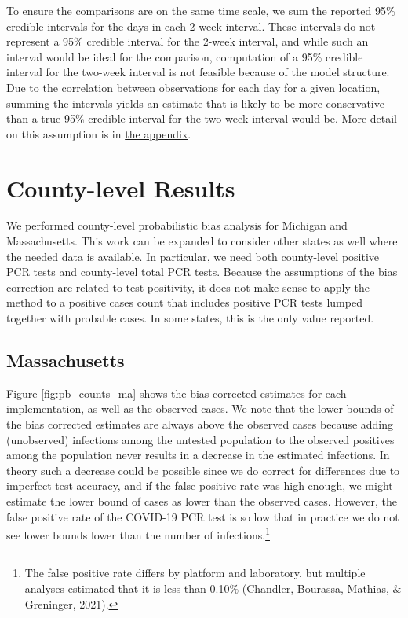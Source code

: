 \documentclass[12pt,twoside]{smiththesis}
\begin{document}
To ensure the comparisons are on the same time scale, we sum the reported 95\% credible intervals for the days in each 2-week interval. These intervals do not represent a 95\% credible interval for the 2-week interval, and while such an interval would be ideal for the comparison, computation of a 95\% credible interval for the two-week interval is not feasible because of the model structure. Due to the correlation between observations for each day for a given location, summing the intervals yields an estimate that is likely to be more conservative than a true 95\% credible interval for the two-week interval would be. More detail on this assumption is in \protect\hyperlink{conservativeintervals}{the appendix}.

\hypertarget{county-level-results}{%
\section{County-level Results}\label{county-level-results}}

We performed county-level probabilistic bias analysis for Michigan and Massachusetts. This work can be expanded to consider other states as well where the needed data is available. In particular, we need both county-level positive PCR tests and county-level total PCR tests. Because the assumptions of the bias correction are related to test positivity, it does not make sense to apply the method to a positive cases count that includes positive PCR tests lumped together with probable cases. In some states, this is the only value reported.

\hypertarget{massachusetts}{%
\subsection{Massachusetts}\label{massachusetts}}

Figure \ref{fig:pb_counts_ma} shows the bias corrected estimates for each implementation, as well as the observed cases. We note that the lower bounds of the bias corrected estimates are always above the observed cases because adding (unobserved) infections among the untested population to the observed positives among the population never results in a decrease in the estimated infections. In theory such a decrease could be possible since we do correct for differences due to imperfect test accuracy, and if the false positive rate was high enough, we might estimate the lower bound of cases as lower than the observed cases. However, the false positive rate of the COVID-19 PCR test is so low that in practice we do not see lower bounds lower than the number of infections.\footnote{The false positive rate differs by platform and laboratory, but multiple analyses estimated that it is less than 0.10\% (Chandler, Bourassa, Mathias, \& Greninger, 2021).}
\end{document}
